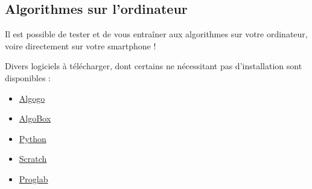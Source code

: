 	\begin{nosummary}
    \section{Algorithmes sur l'ordinateur}

    Il est possible de tester et de vous entraîner aux algorithmes sur votre ordinateur, voire directement sur votre smartphone !

    \begin{tip}
      Divers logiciels à télécharger, dont certains ne nécessitant pas d'installation sont disponibles :
      \begin{itemize}
        \item \href{https://www.algogo.xyz}{Algogo}
        \item \href{http://www.xm1math.net/algobox/}{AlgoBox}
        \item \href{https://python.org}{Python}
        \item \href{https://scratch.mit.edu/}{Scratch}
        \item \href{http://proglab.fr/}{Proglab}
      \end{itemize}
    \end{tip}
  \end{nosummary}

